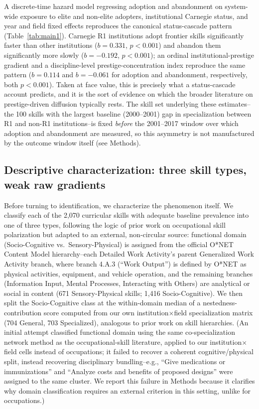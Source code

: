 \documentclass[11pt, letterpaper]{article}
\begin{document}
A discrete-time hazard model regressing adoption and abandonment on system-wide exposure to elite and non-elite adopters, institutional Carnegie status, and year and field fixed effects reproduces the canonical status-cascade pattern (Table~\ref{tab:main1}). Carnegie R1 institutions adopt frontier skills significantly faster than other institutions ($b=0.331$, $p<0.001$) and abandon them significantly more slowly ($b=-0.192$, $p<0.001$); an ordinal institutional-prestige gradient and a discipline-level prestige-concentration index reproduce the same pattern ($b=0.114$ and $b=-0.061$ for adoption and abandonment, respectively, both $p<0.001$). Taken at face value, this is precisely what a status-cascade account predicts, and it is the sort of evidence on which the broader literature on prestige-driven diffusion typically rests. The skill set underlying these estimates--the 100 skills with the largest baseline (2000--2001) gap in specialization between R1 and non-R1 institutions--is fixed \emph{before} the 2001--2017 window over which adoption and abandonment are measured, so this asymmetry is not manufactured by the outcome window itself (see Methods).

\subsection*{Descriptive characterization: three skill types, weak raw gradients}

Before turning to identification, we characterize the phenomenon itself. We classify each of the 2,070 curricular skills with adequate baseline prevalence into one of three types, following the logic of prior work on occupational skill polarization but adapted to an external, non-circular source: functional domain (Socio-Cognitive vs.\ Sensory-Physical) is assigned from the official O*NET Content Model hierarchy--each Detailed Work Activity's parent Generalized Work Activity branch, where branch 4.A.3 (``Work Output'') is defined by O*NET as physical activities, equipment, and vehicle operation, and the remaining branches (Information Input, Mental Processes, Interacting with Others) are analytical or social in content (671 Sensory-Physical skills; 1,416 Socio-Cognitive). We then split the Socio-Cognitive class at the within-domain median of a nestedness-contribution score computed from our own institution$\times$field specialization matrix (704 General, 703 Specialized), analogous to prior work on skill hierarchies. (An initial attempt classified functional domain using the same co-specialization network method as the occupational-skill literature, applied to our institution$\times$field cells instead of occupations; it failed to recover a coherent cognitive/physical split, instead recovering disciplinary bundling--e.g., ``Give medications or immunizations'' and ``Analyze costs and benefits of proposed designs'' were assigned to the same cluster. We report this failure in Methods because it clarifies why domain classification requires an external criterion in this setting, unlike for occupations.)
\end{document}
